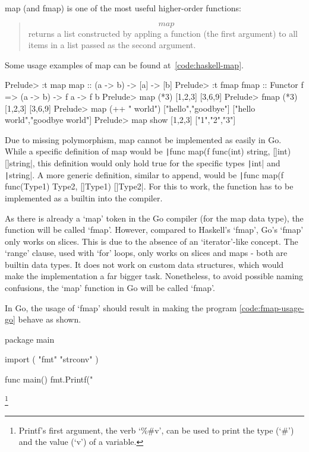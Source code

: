 map (and fmap) is one of the most useful higher-order functions:
\begin{quote}
    \[map\] returns a list constructed by appling a function (the first argument) to all
    items in a list passed as the second argument\autocite{haskell-map}.
\end{quote}

Some usage examples of map can be found at~\ref{code:haskell-map}.

\begin{code}
    \label{code:haskell-map}
    \begin{haskellcode}
Prelude> :t map
map :: (a -> b) -> [a] -> [b]
Prelude> :t fmap
fmap :: Functor f => (a -> b) -> f a -> f b
Prelude> map (*3) [1,2,3]
[3,6,9]
Prelude> fmap (*3) [1,2,3]
[3,6,9]
Prelude> map (++ " world") ["hello","goodbye"]
["hello world","goodbye world"]
Prelude> map show [1,2,3]
["1","2","3"]
    \end{haskellcode}
\end{code}

Due to missing polymorphism, map cannot be implemented as easily in Go. While
a specific definition of map would be
\texttt|func map(f func(int) string, []int) []string|,
this definition would only hold true for the specific types \texttt|int|
and \texttt|string|. A more generic definition, similar to append,
would be \texttt|func map(f func(Type1) Type2, []Type1) []Type2|. For
this to work, the function has to be implemented as a builtin into the compiler.

As there is already a `map' token in the Go compiler (for the map data type),
the function will be called `fmap'. However, compared to Haskell's `fmap',
Go's `fmap' only works on slices. This is due
to the absence of an `iterator'-like concept. The `range' clause, used with
`for' loops, only works on slices and maps - both are builtin data types. It does
not work on custom data structures, which would make the implementation a far
bigger task.
Nonetheless, to avoid possible naming confusions, the `map' function in Go will
be called `fmap'.

In Go, the usage of `fmap' should result in making the program \ref{code:fmap-usage-go}
behave as shown.

\begin{code}
    \label{code:fmap-usage-go}
    \begin{gocode}
package main

import (
  "fmt"
  "strconv"
)

func main() {
  fmt.Printf("%
}
\end{gocode}
\footnote{Printf's first argument, the verb `\%\#v', can be used to print the type
(`\#') and the value (`v') of a variable\autocite{fmt-godoc}.}
\end{code}

